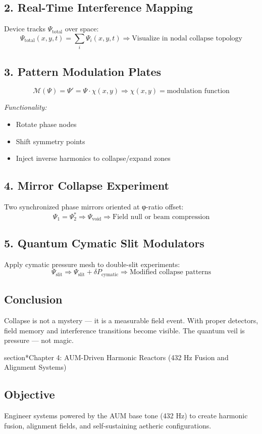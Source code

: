 \documentclass[12pt]{book}
\begin{document}
\subsection*{2. Real-Time Interference Mapping}
Device tracks $\Psi_{\text{total}}$ over space:
\[
\Psi_{\text{total}}(x,y,t) = \sum_i \Psi_i(x,y,t)
\Rightarrow \text{Visualize in nodal collapse topology}
\]

\subsection*{3. Pattern Modulation Plates}
\[
\mathcal{M}(\Psi) = \Psi' = \Psi \cdot \chi(x,y)
\Rightarrow \chi(x,y) = \text{modulation function}
\]

\textit{Functionality:}
\begin{itemize}
  \item Rotate phase nodes
  \item Shift symmetry points
  \item Inject inverse harmonics to collapse/expand zones
\end{itemize}

\subsection*{4. Mirror Collapse Experiment}
Two synchronized phase mirrors oriented at φ-ratio offset:
\[
\Psi_1 = \Psi_2^* \Rightarrow \Psi_{\text{void}} \Rightarrow \text{Field null or beam compression}
\]

\subsection*{5. Quantum Cymatic Slit Modulators}
Apply cymatic pressure mesh to double-slit experiments:
\[
\Psi_{\text{slit}} \Rightarrow \Psi_{\text{slit}} + \delta P_{\text{cymatic}} \Rightarrow \text{Modified collapse patterns}
\]

\subsection*{Conclusion}
Collapse is not a mystery — it is a measurable field event. With proper detectors, field memory and interference transitions become visible. The quantum veil is pressure — not magic.




section*{Chapter 4: AUM-Driven Harmonic Reactors (432 Hz Fusion and Alignment Systems)}

\subsection*{Objective}
Engineer systems powered by the AUM base tone (432 Hz) to create harmonic fusion, alignment fields, and self-sustaining aetheric configurations.
\end{document}
